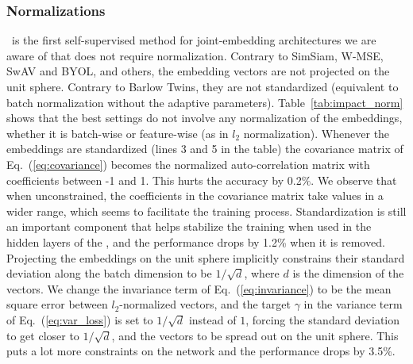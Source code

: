 \subsubsection{Normalizations} 
\algo \ is the first self-supervised method for joint-embedding architectures we are aware of that does not require normalization. Contrary to SimSiam, W-MSE, SwAV and BYOL, and others, the embedding vectors are not projected on the unit sphere. Contrary to Barlow Twins, they are not standardized (equivalent to batch normalization without the adaptive parameters). Table~\ref{tab:impact_norm} shows that the best settings do not involve any normalization of the embeddings, whether it is batch-wise or feature-wise (as in  $l_2$ normalization). Whenever the embeddings are standardized (lines 3 and 5 in the table) the covariance matrix of Eq.~(\ref{eq:covariance}) becomes the normalized auto-correlation matrix with coefficients between -1 and 1. This hurts the accuracy by 0.2$\%$. We observe that when unconstrained, the coefficients in the covariance matrix take values in a wider range, which seems to facilitate the training process. Standardization is still an important component that helps stabilize the training when used in the hidden layers of the \expandernospace, and the performance drops by 1.2\% when it is removed. Projecting the embeddings on the unit sphere implicitly constrains their standard deviation along the batch dimension to be $1/\sqrt{d}$, where $d$ is the dimension of the vectors. We change the invariance term of Eq.~(\ref{eq:invariance}) to be the mean square error between $l_2$-normalized vectors, and the target $\gamma$ in the variance term of Eq.~(\ref{eq:var_loss}) is set to $1/\sqrt{d}$ instead of $1$, forcing the standard deviation to get closer to $1/\sqrt{d}$, and the vectors to be spread out on the unit sphere. This puts a lot more constraints on the network and the performance drops by 3.5\%.

\clearpage

